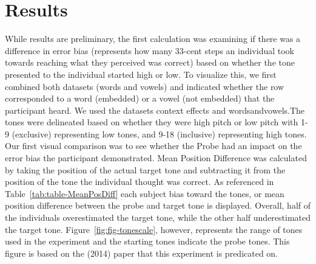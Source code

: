 \documentclass[
  man,floatsintext]{apa6}
\begin{document}
\hypertarget{results}{%
\section{Results}\label{results}}

While results are preliminary, the first calculation was examining if there was a difference in error bias (represents how many 33-cent steps an individual took towards reaching what they perceived was correct) based on whether the tone presented to the individual started high or low. To visualize this, we first combined both datasets (words and vowels) and indicated whether the row corresponded to a word (embedded) or a vowel (not embedded) that the participant heard. We used the datasets context effects and wordsandvowels.The tones were delineated based on whether they were high pitch or low pitch with 1-9 (exclusive) representing low tones, and 9-18 (inclusive) representing high tones. Our first visual comparison was to see whether the Probe had an impact on the error bias the participant demonstrated. Mean Position Difference was calculated by taking the position of the actual target tone and subtracting it from the position of the tone the individual thought was correct. As referenced in Table~\ref{tab:table-MeanPosDiff} each subject bias toward the tones, or mean position difference between the probe and target tone is displayed. Overall, half of the individuals overestimated the target tone, while the other half underestimated the target tone. Figure~\ref{fig:fig-tonescale}, however, represents the range of tones used in the experiment and the starting tones indicate the probe tones. This figure is based on the (2014) paper that this experiment is predicated on.
\end{document}
